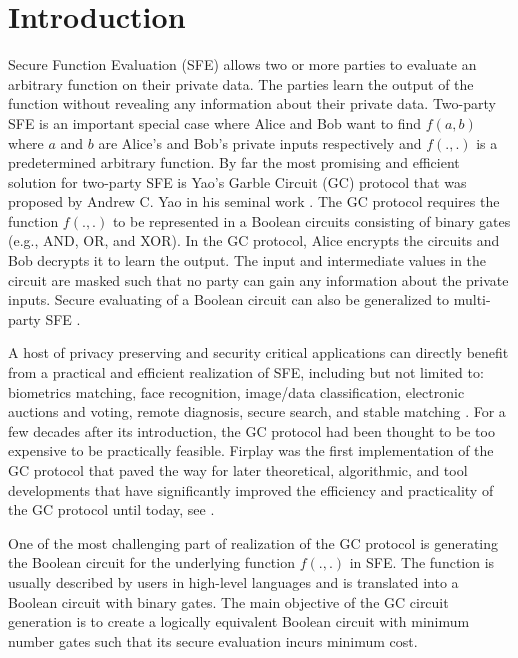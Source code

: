 \chapter{Introduction}
Secure Function Evaluation (SFE) allows two or more parties to evaluate an arbitrary function on their private data.
The parties learn the output of the function without revealing any information about their private data.
Two-party SFE is an important special case where Alice and Bob want to find $f(a, b)$ where $a$ and $b$ are Alice's and Bob's private inputs respectively and $f(., .)$ is a predetermined arbitrary function.
By far the most promising and efficient solution for two-party SFE is Yao's Garble Circuit (GC) protocol that was proposed by Andrew C. Yao in his seminal work \cite{yao1986generate}.
The GC protocol requires the function $f(., .)$ to be represented in a Boolean circuits consisting of binary gates (e.g., AND, OR, and XOR).
In the GC protocol, Alice encrypts the circuits and Bob decrypts it to learn the output.
The input and intermediate values in the circuit are masked such that no party can gain any information about the private inputs.
Secure evaluating of a Boolean circuit can also be generalized to multi-party SFE \cite{goldreich1987play, ben2008fairplaymp}.

A host of privacy preserving and security critical applications can directly benefit from a practical and efficient realization of SFE, including but not limited to: biometrics matching, face recognition, image/data classification, electronic auctions and voting, remote diagnosis, secure search, and stable matching \cite{riazi2017toward, zhang2016robust, bringer2013privacy, evans2011efficient, barni2009secure, naor1999privacy, brickell2007privacy, jha2008towards}.
For a few decades after its introduction, the GC protocol had been thought to be too expensive to be practically feasible.
Firplay \cite{malkhi2004fairplay} was the first implementation of the GC protocol that paved the way for later theoretical, algorithmic, and tool developments that have significantly improved the efficiency and practicality of the GC protocol until today, see \cite{malkhi2004fairplay, kolesnikov2008improved, pinkas2009secure, huang2011faster, bellare2013efficient, zahur2015two, zahur2015obliv, liu2015oblivm}.

One of the most challenging part of realization of the GC protocol is generating the Boolean circuit for the underlying function $f(., .)$ in SFE.
The function is usually described by users in high-level languages and is translated into a Boolean circuit with binary gates.
The main objective of the GC circuit generation is to create a logically equivalent Boolean circuit with minimum number gates such that its secure evaluation incurs minimum cost.

